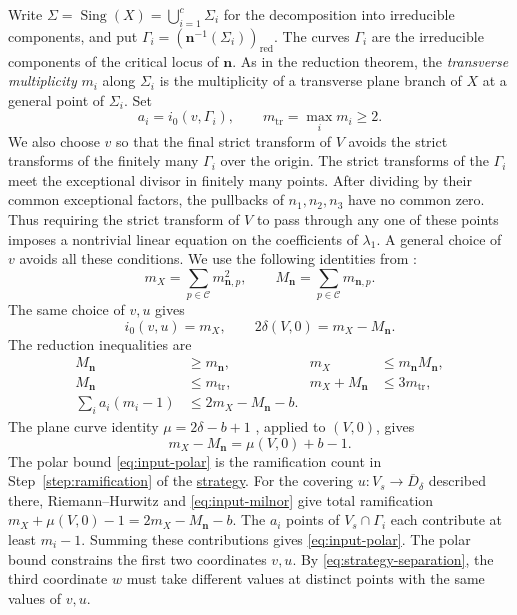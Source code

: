 \documentclass[11pt,letterpaper]{article}
\numberwithin{equation}{section}
\theoremstyle{remark}
\theoremstyle{plain}
\begin{document}
Write $\Sigma=\operatorname{Sing}(X)=\bigcup_{i=1}^c\Sigma_i$
for the decomposition into irreducible components, and put
$\Gamma_i=(\boldsymbol n^{-1}(\Sigma_i))_{\mathrm{red}}$.
The curves $\Gamma_i$ are the irreducible components of the critical
locus of $\boldsymbol n$.  As in the reduction theorem, the
\emph{transverse multiplicity} $m_i$ along $\Sigma_i$ is the multiplicity
of a transverse plane branch of $X$ at a general point of $\Sigma_i$.  Set
\[
 a_i=i_0(v,\Gamma_i),\qquad m_{\mathrm{tr}}=\max_i m_i\geq2.
\]
We also choose $v$ so that the final strict transform of $V$ avoids the
strict transforms of the finitely many $\Gamma_i$ over the origin.
The strict transforms of the $\Gamma_i$ meet the exceptional divisor
in finitely many points.  After dividing by their common exceptional
factors, the pullbacks of $n_1,n_2,n_3$ have no common zero.  Thus
requiring the strict transform of $V$ to pass through any one of these
points imposes a nontrivial linear equation on the coefficients of
$\lambda_1$.
A general choice of $v$ avoids all these conditions. We use the following 
identities from
\cite[equations~(2.18)--(2.19)]{PortillaReduction}:
\begin{equation}
 m_X=\sum_{p\in\mathcal C}m_{\boldsymbol n,p}^2,\qquad
 M_{\boldsymbol n}=\sum_{p\in\mathcal C}m_{\boldsymbol n,p}.
 \label{eq:input-point-basis}
\end{equation}
The same choice of $v,u$ gives
\begin{equation}
 i_0(v,u)=m_X,\qquad
 2\delta(V,0)=m_X-M_{\boldsymbol n}.                 \label{eq:input-point}
\end{equation}
The reduction inequalities
\cite[Propositions~2.16 and~2.17, Theorem~4.5]{PortillaReduction} are
\begin{align}
 M_{\boldsymbol n}&\geq m_{\boldsymbol n},&
 m_X&\leq m_{\boldsymbol n}M_{\boldsymbol n},          \label{eq:input-resolution}\\
 M_{\boldsymbol n}&\leq m_{\mathrm{tr}},&
 m_X+M_{\boldsymbol n}&\leq3m_{\mathrm{tr}},            \label{eq:input-knot}\\
 \sum_i a_i(m_i-1)&\leq2m_X-M_{\boldsymbol n}-b.        \label{eq:input-polar}
\end{align}
The plane curve identity $\mu=2\delta-b+1$
\cite[Proposition~I.3.35]{GreuelLossenShustin}, applied to $(V,0)$, gives
\begin{equation}
 m_X-M_{\boldsymbol n}=\mu(V,0)+b-1.                 \label{eq:input-milnor}
\end{equation}
The polar bound \eqref{eq:input-polar} is the ramification count in
Step~\ref{step:ramification} of the \hyperref[sec:strategy]{strategy}.
For the covering $u:V_s\to\overline D_\delta$ described there,
Riemann--Hurwitz and \eqref{eq:input-milnor} give total ramification
$m_X+\mu(V,0)-1=2m_X-M_{\boldsymbol n}-b$.
The $a_i$ points of $V_s\cap\Gamma_i$ each contribute at least
$m_i-1$.  Summing these contributions gives \eqref{eq:input-polar}.
The polar bound constrains the first two coordinates $v,u$.  By
\eqref{eq:strategy-separation}, the third coordinate $w$ must take
different values at distinct points with the same values of $v,u$.
\end{document}
